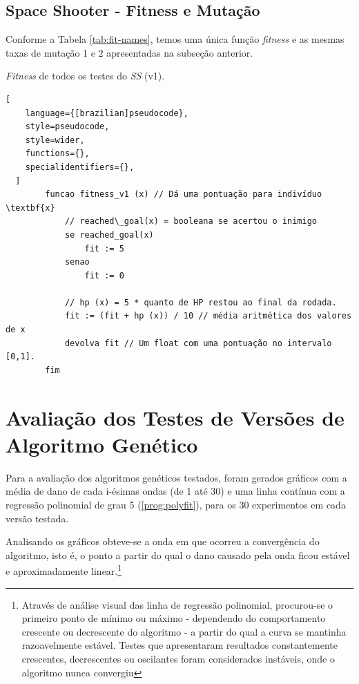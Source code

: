 \subsection{Space Shooter - Fitness e Mutação}
\label{sec:ss-fit}

Conforme a Tabela \ref{tab:fit-names}, temos uma única função \textit{fitness} e as mesmas taxas de mutação 1 e 2 apresentadas na subseção anterior.

\begin{programruledcaption}{\textit{Fitness} de todos os testes do \textit{SS} (v1).\label{prog:avaliacao_SS1}}
  \begin{lstlisting}[
    language={[brazilian]pseudocode},
    style=pseudocode,
    style=wider,
    functions={},
    specialidentifiers={},
  ]
        funcao fitness_v1 (x) // Dá uma pontuação para indivíduo \textbf{x}
            // reached\_goal(x) = booleana se acertou o inimigo
            se reached_goal(x)
                fit := 5
            senao
                fit := 0
            
            // hp (x) = 5 * quanto de HP restou ao final da rodada.
	        fit := (fit + hp (x)) / 10 // média aritmética dos valores de x
	        devolva fit // Um float com uma pontuação no intervalo [0,1].
        fim
  \end{lstlisting}
\end{programruledcaption}%


\section{Avaliação dos Testes de Versões de Algoritmo Genético}
\label{sec:fit-res}

 Para a avaliação dos algoritmos genéticos testados, foram gerados gráficos com a média de dano de cada i-ésimas ondas (de 1 até 30) e uma linha contínua com a regressão polinomial de grau 5 (\ref{prog:polyfit}), para os 30 experimentos em cada versão testada.
 
 Analisando os gráficos obteve-se a onda em que ocorreu a convergência do algoritmo, isto é, o ponto a partir do qual o dano causado pela onda ficou estável e aproximadamente linear.\footnote{Através de análise visual das linha de regressão polinomial, procurou-se o primeiro ponto de mínimo ou máximo - dependendo do comportamento crescente ou decrescente do algoritmo - a partir do qual a curva se mantinha razoavelmente estável. Testes que apresentaram resultados constantemente crescentes, decrescentes ou oscilantes foram considerados instáveis, onde o algoritmo nunca convergiu}

